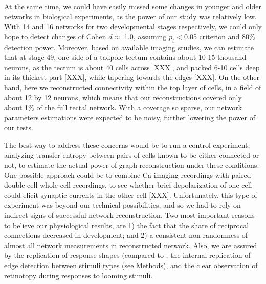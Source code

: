 \documentclass{article}
\begin{document}
At the same time, we could have easily missed some changes in younger and older networks in biological experiments, as the power of our study was relatively low. With 14 and 16 networks for two developmental stages respectively, we could only hope to detect changes of Cohen $d \approx$ 1.0, assuming $p_t<$0.05 criterion and 80\% detection power. Moreover, based on available imaging studies, we can estimate that at stage 49, one side of a tadpole tectum contains about 10-15 thousand neurons, as the tectum is about 40 cells across [XXX], and packed 6-10 cells deep in its thickest part [XXX], while tapering towards the edges [XXX]. On the other hand, here we reconstructed connectivity within the top layer of cells, in a field of about 12 by 12 neurons, which means that our reconstructions covered only about 1\% of the full tectal network. With a coverage so sparse, our network parameters estimations were expected to be noisy, further lowering the power of our tests.

The best way to address these concerns would be to run a control experiment, analyzing transfer entropy between pairs of cells known to be either connected or not, to estimate the actual power of graph reconstruction under these conditions. One possible approach could be to combine Ca imaging recordings with paired double-cell whole-cell recordings, to see whether brief depolarization of one cell could elicit synaptic currents in the other cell [XXX]. Unfortunately, this type of experiment was beyond our technical possibilities, and so we had to rely on indirect signs of successful network reconstruction. Two most important reasons to believe our physiological results, are 1) the fact that the share of reciprocal connections decreased in development; and 2) a consistent non-randomness of almost all network measurements in reconstructed network. Also, we are assured by the replication of response shapes (compared to \citep{khakhalin2014}, the internal replication of edge detection between stimuli types (see Methods), and the clear observation of retinotopy during responses to looming stimuli.
\end{document}
